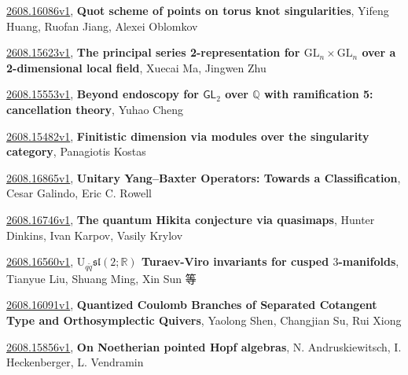 \documentclass[9pt, a4paper]{article}
\theoremstyle{plain}
\theoremstyle{definition}
\theoremstyle{remark}
\newcommand{\arxiv}[3]{\href{https://arxiv.org/abs/#1}{#1}, \textbf{\textcolor{arxivblue}{#2}}, #3}
\begin{document}
\arxiv{2608.16086v1}{Quot scheme of points on torus knot singularities}{Yifeng Huang, Ruofan Jiang, Alexei Oblomkov}

\arxiv{2608.15623v1}{The principal series 2-representation for $\mathrm{GL}_n\times\mathrm{GL}_n$ over a 2-dimensional local field}{Xuecai Ma, Jingwen Zhu}

\arxiv{2608.15553v1}{Beyond endoscopy for $\mathsf{GL}_2$ over $\mathbb{Q}$ with ramification 5: cancellation theory}{Yuhao Cheng}

\arxiv{2608.15482v1}{Finitistic dimension via modules over the singularity category}{Panagiotis Kostas}

\arxiv{2608.16865v1}{Unitary Yang--Baxter Operators: Towards a Classification}{Cesar Galindo, Eric C. Rowell}

\arxiv{2608.16746v1}{The quantum Hikita conjecture via quasimaps}{Hunter Dinkins, Ivan Karpov, Vasily Krylov}

\arxiv{2608.16560v1}{$\mathrm {U}_{q\tilde q}\mathfrak{sl}(2;\mathbb R)$ Turaev-Viro invariants for cusped $3$-manifolds}{Tianyue Liu, Shuang Ming, Xin Sun 等}

\arxiv{2608.16091v1}{Quantized Coulomb Branches of Separated Cotangent Type and Orthosymplectic Quivers}{Yaolong Shen, Changjian Su, Rui Xiong}

\arxiv{2608.15856v1}{On Noetherian pointed Hopf algebras}{N. Andruskiewitsch, I. Heckenberger, L. Vendramin}

\end{document}
